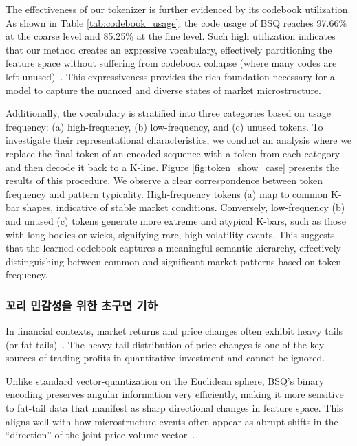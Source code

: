 The effectiveness of our tokenizer is further evidenced by its codebook utilization. As shown in Table \ref{tab:codebook_usage}, the code usage of BSQ reaches 97.66\% at the coarse level and 85.25\% at the fine level. Such high utilization indicates that our method creates an expressive vocabulary, effectively partitioning the feature space without suffering from codebook collapse (where many codes are left unused)~\cite{zhu2024addressing}. This expressiveness provides the rich foundation necessary for a model to capture the nuanced and diverse states of market microstructure.


Additionally, the vocabulary is stratified into three categories based on usage frequency: (a) high-frequency, (b) low-frequency, and (c) unused tokens. To investigate their representational characteristics, we conduct an analysis where we replace the final token of an encoded sequence with a token from each category and then decode it back to a K-line. Figure \ref{fig:token_show_case} presents the results of this procedure. We observe a clear correspondence between token frequency and pattern typicality. High-frequency tokens (a) map to common K-bar shapes, indicative of stable market conditions. Conversely, low-frequency (b) and unused (c) tokens generate more extreme and atypical K-bars, such as those with long bodies or wicks, signifying rare, high-volatility events. This suggests that the learned codebook captures a meaningful semantic hierarchy, effectively distinguishing between common and significant market patterns based on token frequency.



\subsubsection{꼬리 민감성을 위한 초구면 기하}
In financial contexts, market returns and price changes often exhibit heavy tails (or fat tails)~\cite{mandelbrot1963variation}. The heavy-tail distribution of price changes is one of the key sources of trading profits in quantitative investment and cannot be ignored.

Unlike standard vector-quantization on the Euclidean sphere, BSQ’s binary encoding preserves angular information very efficiently, making it more sensitive to fat-tail data that manifest as sharp directional changes in feature space. This aligns well with how microstructure events often appear as abrupt shifts in the “direction” of the joint price-volume vector~\cite{podobnik2009cross}.

